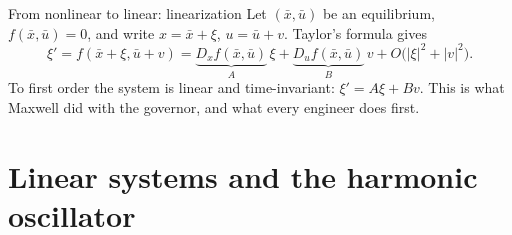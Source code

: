 \documentclass[10pt]{beamer}
\begin{document}
\begin{frame}{From nonlinear to linear: linearization}
Let $(\bar x,\bar u)$ be an equilibrium, $f(\bar x,\bar u)=0$, and write $x=\bar x+\xi$, $u=\bar u+v$. Taylor's formula gives
\[
\xi'=f(\bar x+\xi,\bar u+v)=\underbrace{D_xf(\bar x,\bar u)}_{A}\,\xi+\underbrace{D_uf(\bar x,\bar u)}_{B}\,v+O\big(|\xi|^2+|v|^2\big).
\]
To first order the system is \alert{linear and time-invariant}: $\xi'=A\xi+Bv$. This is what Maxwell did with the governor, and what every engineer does first.

\end{frame}


\section{Linear systems and the harmonic oscillator}
\end{document}
